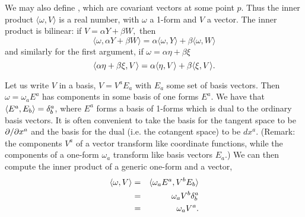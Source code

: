 \begin{defn}
We may also define , which are covariant vectors at some point $p$. Thus the inner product $\langle \omega, V\rangle$ is a real number, with $\omega$ a 1-form and $V$ a vector. The inner product is bilinear:
if $V=\alpha Y + \beta W,$ then
$$\langle \omega, \alpha Y + \beta W\rangle = \alpha\langle \omega, Y\rangle +\beta \langle \omega, W\rangle$$
and similarly for the first argument, if $\omega = \alpha \eta+\beta \xi$
$$\langle\alpha \eta +\beta\xi, V\rangle = \alpha \langle\eta, V\rangle +\beta \langle\xi, V\rangle.$$
\end{defn}

Let us write $V$ in a basis, $V=V^a E_a$ with $E_a$ some set of basis vectors. Then $\omega= \omega_a E^a$ has components in some basis of one forms $E^a$. We have that $\langle E^a, E_b\rangle=\delta^a_b$, where $E^a$ forms a basis of 1-forms which is dual to the ordinary basis vectors. It is often convenient to take the basis for the tangent space to be $\partial/\partial x^a$ and the basis for the dual (i.e. the cotangent space) to be $dx^a$. (Remark: the components $V^a$ of a vector transform like coordinate functions, while the components of a one-form $\omega_a$ transform like basis vectors $E_a$.) We can then compute the inner product of a generic one-form and a vector, %
\begin{eqnarray*}
\langle\omega,V\rangle&=&\langle\omega_a E^a, V^b E_b\rangle\\
&=& \omega_a V^b \delta^a_b\\
&=& \omega_a V^a.
\end{eqnarray*}
